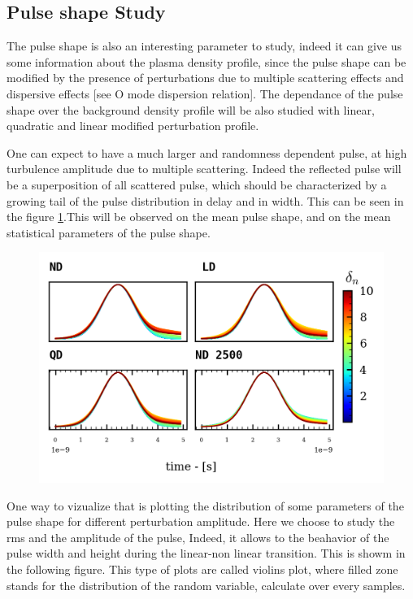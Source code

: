 \documentclass[11pt,a4paper]{report}
\begin{document}
\begin{multicols}{2}
    \subsection{Pulse shape Study}
    The pulse shape is also an interesting parameter to study, indeed it can give us some information about the plasma density profile, since the pulse shape can be modified by the presence of perturbations due to multiple scattering effects and dispersive effects [see O mode dispersion relation].
    The dependance of the pulse shape over the background density profile will be also studied with linear, quadratic and linear modified perturbation profile.


    One can expect to have a much larger and randomness dependent pulse, at high turbulence amplitude due to multiple scattering.
    Indeed the reflected pulse will be a superposition of all scattered pulse, which should be characterized by a growing tail of the pulse distribution in delay and in width. This can be seen in the figure \ref{fig:barrier}.This will be observed on the mean pulse shape, and on the mean statistical parameters of the pulse shape.
    \begin{figure}[H]
        \centering
        \includegraphics[width=1\linewidth]{./figures/pulse_shape.png}
        \label{fig:barrier}
    \end{figure}
    One way to vizualize that is plotting the distribution of some parameters of the pulse shape for different perturbation amplitude.
    Here we choose to study the rms and the amplitude of the pulse, Indeed, it allows to the beahavior of the pulse width and height during the linear-non linear transition.
    This is showm in the following figure. This type of plots are called violins plot, where filled zone stands for the distribution of the random variable, calculate over every samples.

\end{multicols}
\end{document}
